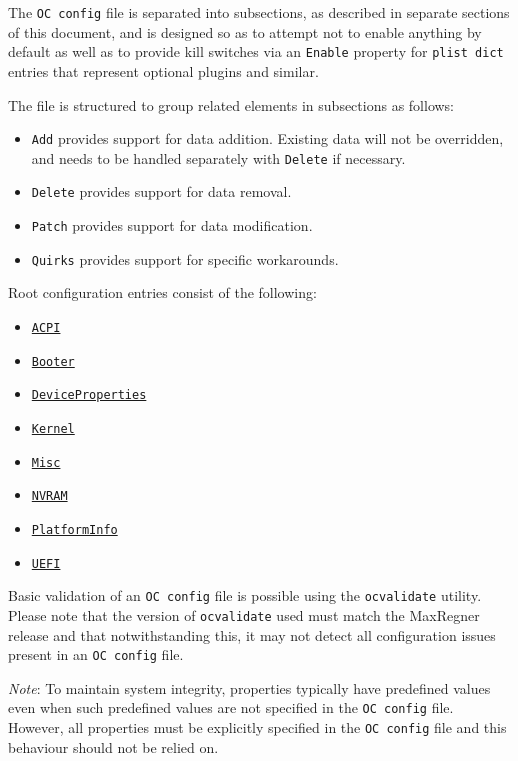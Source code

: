 \documentclass[]{article}
\providecommand{\tightlist}{%
  \setlength{\itemsep}{0pt}\setlength{\parskip}{0pt}}
\begin{document}
The \texttt{OC\ config} file is separated into subsections, as described in
separate sections of this document, and is designed so as to attempt not to
enable anything by default as well as to provide kill switches via an \texttt{Enable}
property for \texttt{plist dict} entries that represent optional plugins and similar.

The file is structured to group related elements in subsections as follows:

\begin{itemize}
\tightlist
\item
  \texttt{Add} provides support for data addition. Existing data will
  not be overridden, and needs to be handled separately with
  \texttt{Delete} if necessary.
\item
  \texttt{Delete} provides support for data removal.
\item
  \texttt{Patch} provides support for data modification.
\item
  \texttt{Quirks} provides support for specific workarounds.
\end{itemize}

Root configuration entries consist of the following:

\begin{itemize}
\tightlist
\item
  \hyperref[acpi]{\texttt{ACPI}}
\item
  \hyperref[booter]{\texttt{Booter}}
\item
  \hyperref[devprops]{\texttt{DeviceProperties}}
\item
  \hyperref[kernel]{\texttt{Kernel}}
\item
  \hyperref[misc]{\texttt{Misc}}
\item
  \hyperref[nvram]{\texttt{NVRAM}}
\item
  \hyperref[platforminfo]{\texttt{PlatformInfo}}
\item
  \hyperref[uefi]{\texttt{UEFI}}
\end{itemize}

Basic validation of an \texttt{OC\ config} file is possible using
the \texttt{ocvalidate} utility. Please note that the version of \texttt{ocvalidate}
used must match the MaxRegner release and that notwithstanding this, it may not
detect all configuration issues present in an \texttt{OC\ config} file.

\emph{Note}: To maintain system integrity, properties typically have predefined values even
when such predefined values are not specified in the \texttt{OC\ config} file. However, all
properties must be explicitly specified in the \texttt{OC\ config} file and this behaviour
should not be relied on.
\end{document}
